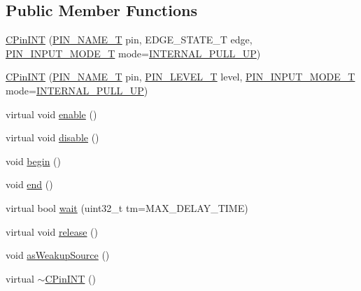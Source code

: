\subsection*{Public Member Functions}
\begin{DoxyCompactItemize}
\item 
\hyperlink{class_c_pin_i_n_t_a71f5452b1d99597b04082bf402f4ae59}{C\-Pin\-I\-N\-T} (\hyperlink{group___enumerations_ga65a2241721e4acb573e0c3fe29ac432f}{P\-I\-N\-\_\-\-N\-A\-M\-E\-\_\-\-T} pin, E\-D\-G\-E\-\_\-\-S\-T\-A\-T\-E\-\_\-\-T edge, \hyperlink{group___enumerations_ga9f8f32709b482732d6e377ff26da36ef}{P\-I\-N\-\_\-\-I\-N\-P\-U\-T\-\_\-\-M\-O\-D\-E\-\_\-\-T} mode=\hyperlink{group___enumerations_gga9f8f32709b482732d6e377ff26da36efa781a7f23ae9b0dbdc6edfdcfd3be75df}{I\-N\-T\-E\-R\-N\-A\-L\-\_\-\-P\-U\-L\-L\-\_\-\-U\-P})
\item 
\hyperlink{class_c_pin_i_n_t_a48e6afdca1e70de51e292d1d3c4bafc5}{C\-Pin\-I\-N\-T} (\hyperlink{group___enumerations_ga65a2241721e4acb573e0c3fe29ac432f}{P\-I\-N\-\_\-\-N\-A\-M\-E\-\_\-\-T} pin, \hyperlink{group___enumerations_ga6f24594071a026b31238ab8cb80d6a80}{P\-I\-N\-\_\-\-L\-E\-V\-E\-L\-\_\-\-T} level, \hyperlink{group___enumerations_ga9f8f32709b482732d6e377ff26da36ef}{P\-I\-N\-\_\-\-I\-N\-P\-U\-T\-\_\-\-M\-O\-D\-E\-\_\-\-T} mode=\hyperlink{group___enumerations_gga9f8f32709b482732d6e377ff26da36efa781a7f23ae9b0dbdc6edfdcfd3be75df}{I\-N\-T\-E\-R\-N\-A\-L\-\_\-\-P\-U\-L\-L\-\_\-\-U\-P})
\item 
virtual void \hyperlink{class_c_pin_i_n_t_a36d2301b10290741be6d3dd86dbc534b}{enable} ()
\item 
virtual void \hyperlink{class_c_pin_i_n_t_a08521d6d6892b7a80452bfce7db03e2b}{disable} ()
\item 
void \hyperlink{class_c_pin_i_n_t_a811526191ebf7ba17f0f51dea004d37b}{begin} ()
\item 
void \hyperlink{class_c_pin_i_n_t_a9f65ac4a7485b63e46b232f8d7ab385f}{end} ()
\item 
virtual bool \hyperlink{class_c_pin_i_n_t_a45e9fb4b6e6300e4c1c2ed6c13cfc062}{wait} (uint32\-\_\-t tm=M\-A\-X\-\_\-\-D\-E\-L\-A\-Y\-\_\-\-T\-I\-M\-E)
\item 
virtual void \hyperlink{class_c_pin_i_n_t_abe0ce7ac090423e11d460e75c8838128}{release} ()
\item 
void \hyperlink{class_c_pin_i_n_t_ae30634b8f9107d2ce4b6c3a52aeb380a}{as\-Weakup\-Source} ()
\item 
virtual \hyperlink{class_c_pin_i_n_t_ab75df389802ed381ac35726196ee15bb}{$\sim$\-C\-Pin\-I\-N\-T} ()
\end{DoxyCompactItemize}
